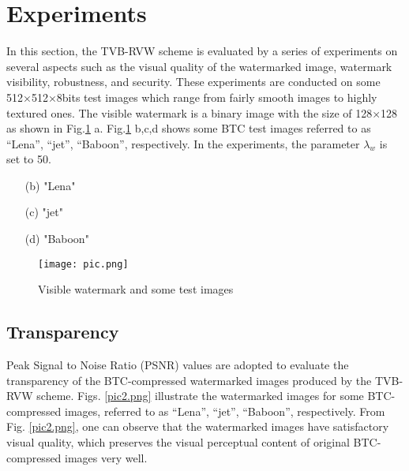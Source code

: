 \documentclass[12pt,a4paper]{article}
\begin{document}
\section{Experiments}
In this section, the TVB-RVW scheme is evaluated by a series of experiments on several aspects such as the visual quality of the watermarked image, watermark visibility, robustness, and security. These experiments are conducted on some 512×512×8bits test images which range from fairly smooth images to highly textured ones. The visible watermark is a binary image with the size of 128×128 as shown in  Fig.\ref{pic.png} a. Fig.\ref{pic.png} b,c,d shows some BTC test images referred to as “Lena”, “jet”, “Baboon”, respectively. In the experiments, the parameter $\lambda_w$ is set to 50.
\begin{itemize}
    \item[(b)] "Lena"
    \item[(c)] "jet"
    \item[(d)] "Baboon"
\end{itemize}
\begin{figure}[!ht]

\centering
\texttt{[image: pic.png]}
\caption{\label{pic.png}Visible watermark and some test images}
\end{figure}

\subsection{Transparency}
Peak Signal to Noise Ratio (PSNR) values are adopted to evaluate the transparency of the BTC-compressed watermarked images produced by the TVB-RVW scheme. Figs. \ref{pic2.png} illustrate the watermarked images for some BTC-compressed images, referred to as “Lena”, “jet”, “Baboon”,
respectively. From Fig. \ref{pic2.png}, one can observe that the watermarked images have satisfactory visual quality, which preserves the visual perceptual content of original BTC-compressed images very well.
\end{document}
